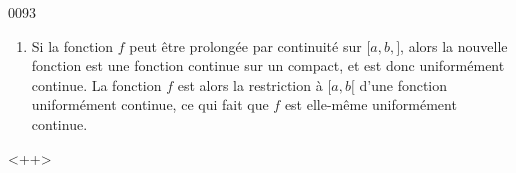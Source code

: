 
\begin{corrige}{0093}

\begin{enumerate}

\item
Si la fonction $f$ peut être prolongée par continuité sur $\mathopen[a,b,\mathclose]$, alors la nouvelle fonction est une fonction continue sur un compact, et est donc uniformément continue. La fonction $f$ est alors la restriction à $\mathopen[a,b[$ d'une fonction uniformément continue, ce qui fait que $f$ est elle-même uniformément continue.

\end{enumerate}
<++>

\end{corrige}
